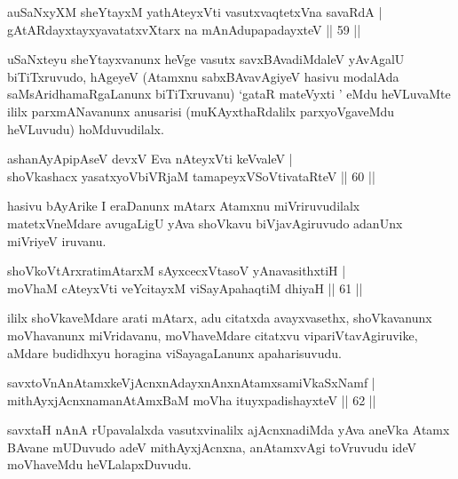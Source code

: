 
\begin{shl}
auSaNxyXM sheYtayxM yathA\s teyxVti vasutxvaqtetxVna savaRdA |\\
gAtARdayxtayxyavatatxvXtarx na mAnAdupapadayxteV \hfill || 59 ||
\end{shl}

\begin{artha}
uSaNxteyu sheYtayxvanunx heVge vasutx savxBAvadiMdaleV yAvAgalU biTiTxruvudo, hAgeyeV (Atamxnu sabxBAvavAgiyeV hasivu modalAda saMsAridhamaRgaLanunx biTiTxruvanu) `gataR mateVyxti ' eMdu heVLuvaMte ililx parxmANavanunx anusarisi  (muKAyxthaRdalilx parxyoVgaveMdu heVLuvudu) hoMduvudilalx. 
\end{artha}

\begin{shl}
ashanAyApipAseV devxV Eva nAteyxVti keVvaleV |\\
shoVkashacx yasatxyoVbiVRjaM tamapeyxVSoV\s tivataRteV \hfill || 60 ||
\end{shl}

\begin{artha}
hasivu bAyArike I eraDanunx mAtarx Atamxnu miVriruvudilalx matetxVneMdare avugaLigU yAva shoVkavu biVjavAgiruvudo adanUnx miVriyeV iruvanu.
\end{artha}


\begin{shl}
shoVkoV\s tArxratimAtarxM sAyxcecxVtasoV yA\s navasithxtiH |\\
moVhaM cAteyxVti veYcitayxM viSayApahaqtiM dhiyaH \hfill || 61 ||
\end{shl}

\begin{artha}%
ililx shoVkaveMdare arati mAtarx, adu citatxda avayxvasethx, shoVkavanunx moVhavanunx miVridavanu, moVhaveMdare citatxvu vipariVtavAgiruvike, aMdare budidhxyu horagina viSayagaLanunx apaharisuvudu.
\end{artha}

\begin{shl}
savxtoV\s nAnAtamxkeV\s jAcnxnAdayxnAnxnAtamxsamiVkaSxNamf |\\
mithAyxjAcnxnamanAtAmxBaM moVha ituyxpadishayxteV \hfill || 62 ||
\end{shl}

\begin{artha}
savxtaH nAnA rUpavalalxda vasutxvinalilx ajAcnxnadiMda yAva aneVka Atamx BAvane mUDuvudo adeV mithAyxjAcnxna, anAtamxvAgi toVruvudu ideV moVhaveMdu heVLalapxDuvudu.
\end{artha}

